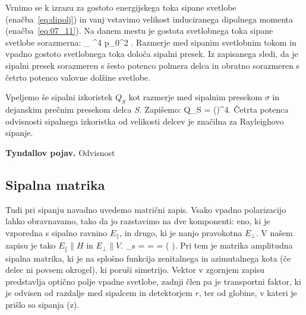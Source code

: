 Vrnimo se k izrazu za gostoto energijskega toka sipane svetlobe (enačba~\ref{eq:dipolj})
in vanj vstavimo velikost induciranega dipolnega momenta (enačba~\ref{eq:07_11}). Na danem
mestu je gostota svetlobnega toka sipane svetlobe sorazmerna:
\beq
{}_ \propto \omega^4 p_0^2 \propto {} 
\propto {}.
\label{eq:07_17}
\eeq
Razmerje med sipanim svetlobnim tokom in vpadno gostoto svetlobnega toka določa sipalni presek. Iz
zapisanega sledi, da je sipalni presek sorazmeren s šesto potenco polmera delca in obratno
sorazmeren s četrto potenco valovne dolžine svetlobe. 

Vpeljemo še sipalni izkoristek $Q_S$ kot razmerje med sipalnim presekom $\sigma$ in 
dejanskim prečnim presekom delca $S$. Zapišemo:
\beq
Q_S =  \propto {}\propto\left(\right)^4\!\!.
\label{eq:07_17}
\eeq
Četrta potenca odvisnosti sipalnega izkoristka od velikosti delcev je značilna za Rayleighovo sipanje.


\begin{example}{\bf Tyndallov pojav.}
Odvisnost  
 
\end{example}

\subsection*{Sipalna matrika}
Tudi pri sipanju navadno uvedemo matrični zapis. Vsako vpadno polarizacijo lahko obravnavamo, tako
da jo razstavimo na dve komponenti: eno, ki je vzporedna s sipalno ravnino $E_\parallel$, in drugo, ki 
je nanjo pravokotna $E_\perp$. V našem zapisu je tako $E_\parallel \parallel H$ in
$E_\perp \parallel V$. 
\beq
{}_s = 
\left[\begin{array}{c}
E_{s,H}\\
E_{s,V}\\
\end{array}\right]
=  = 
\left[\begin{array}{cc}
S_2 & S_3 \\
S_4 & S_1\\
\end{array}\right] 
\left(
\right)\!\!.
\label{eq:07_14}
\eeq
Pri tem je matrika amplitudna sipalna matrika, ki je na splošno funkcija zenitalnega
in azimutalnega kota (če delec ni povsem okrogel), ki poruši simetrijo. Vektor v zgornjem
zapisu predstavlja optično polje vpadne svetlobe, zadnji člen pa je transportni faktor,
ki je odvisen od razdalje med sipalcem in detektorjem $r$, ter od globine, v kateri
je prišlo so sipanja (z).

